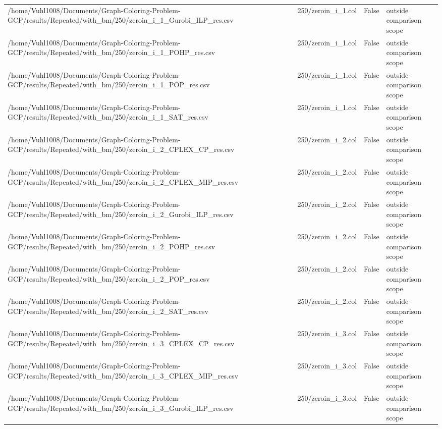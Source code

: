 \begin{table}[htbp]
\begin{tabular}{llll}
/home/Vuhl1008/Documents/Graph-Coloring-Problem-GCP/results/Repeated/with\_bm/250/zeroin\_i\_1\_Gurobi\_ILP\_res.csv & 250/zeroin\_i\_1.col & False & outside comparison scope \\
/home/Vuhl1008/Documents/Graph-Coloring-Problem-GCP/results/Repeated/with\_bm/250/zeroin\_i\_1\_POHP\_res.csv & 250/zeroin\_i\_1.col & False & outside comparison scope \\
/home/Vuhl1008/Documents/Graph-Coloring-Problem-GCP/results/Repeated/with\_bm/250/zeroin\_i\_1\_POP\_res.csv & 250/zeroin\_i\_1.col & False & outside comparison scope \\
/home/Vuhl1008/Documents/Graph-Coloring-Problem-GCP/results/Repeated/with\_bm/250/zeroin\_i\_1\_SAT\_res.csv & 250/zeroin\_i\_1.col & False & outside comparison scope \\
/home/Vuhl1008/Documents/Graph-Coloring-Problem-GCP/results/Repeated/with\_bm/250/zeroin\_i\_2\_CPLEX\_CP\_res.csv & 250/zeroin\_i\_2.col & False & outside comparison scope \\
/home/Vuhl1008/Documents/Graph-Coloring-Problem-GCP/results/Repeated/with\_bm/250/zeroin\_i\_2\_CPLEX\_MIP\_res.csv & 250/zeroin\_i\_2.col & False & outside comparison scope \\
/home/Vuhl1008/Documents/Graph-Coloring-Problem-GCP/results/Repeated/with\_bm/250/zeroin\_i\_2\_Gurobi\_ILP\_res.csv & 250/zeroin\_i\_2.col & False & outside comparison scope \\
/home/Vuhl1008/Documents/Graph-Coloring-Problem-GCP/results/Repeated/with\_bm/250/zeroin\_i\_2\_POHP\_res.csv & 250/zeroin\_i\_2.col & False & outside comparison scope \\
/home/Vuhl1008/Documents/Graph-Coloring-Problem-GCP/results/Repeated/with\_bm/250/zeroin\_i\_2\_POP\_res.csv & 250/zeroin\_i\_2.col & False & outside comparison scope \\
/home/Vuhl1008/Documents/Graph-Coloring-Problem-GCP/results/Repeated/with\_bm/250/zeroin\_i\_2\_SAT\_res.csv & 250/zeroin\_i\_2.col & False & outside comparison scope \\
/home/Vuhl1008/Documents/Graph-Coloring-Problem-GCP/results/Repeated/with\_bm/250/zeroin\_i\_3\_CPLEX\_CP\_res.csv & 250/zeroin\_i\_3.col & False & outside comparison scope \\
/home/Vuhl1008/Documents/Graph-Coloring-Problem-GCP/results/Repeated/with\_bm/250/zeroin\_i\_3\_CPLEX\_MIP\_res.csv & 250/zeroin\_i\_3.col & False & outside comparison scope \\
/home/Vuhl1008/Documents/Graph-Coloring-Problem-GCP/results/Repeated/with\_bm/250/zeroin\_i\_3\_Gurobi\_ILP\_res.csv & 250/zeroin\_i\_3.col & False & outside comparison scope \\

\end{tabular}
\end{table}
